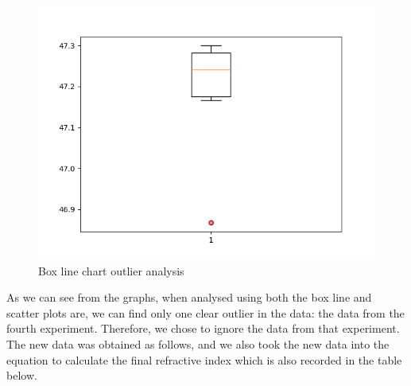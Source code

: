 \documentclass[UTF8]{article}
\begin{document}
\begin{figure}[H]
\begin{minipage}[t]{0.5\linewidth}
                              				\includegraphics[clip,scale=0.5,trim={0 0 0 
                              				0}]{fig/fig19.png}
                              				\caption{Box line chart outlier analysis}
                              				\label{figure.19}
                              			\end{minipage}
                              		\end{figure} 
     
    As we can see from the graphs, when analysed using both the box line and scatter plots are, we can find only one clear outlier in the data: the data from the fourth experiment. Therefore, we chose to ignore the data from that experiment. The new data was obtained as follows, and we also took the new data into the equation to calculate the final refractive index which is also recorded in the table below.
    
\end{document}
